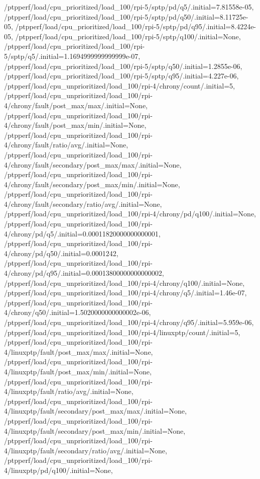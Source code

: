 {    /ptpperf/load/cpu_prioritized/load_100/rpi-5/sptp/pd/q5/.initial=7.81558e-05,
    /ptpperf/load/cpu_prioritized/load_100/rpi-5/sptp/pd/q50/.initial=8.11725e-05,
    /ptpperf/load/cpu_prioritized/load_100/rpi-5/sptp/pd/q95/.initial=8.4224e-05,
    /ptpperf/load/cpu_prioritized/load_100/rpi-5/sptp/q100/.initial=None,
    /ptpperf/load/cpu_prioritized/load_100/rpi-5/sptp/q5/.initial=1.1694999999999999e-07,
    /ptpperf/load/cpu_prioritized/load_100/rpi-5/sptp/q50/.initial=1.2855e-06,
    /ptpperf/load/cpu_prioritized/load_100/rpi-5/sptp/q95/.initial=4.227e-06,
    /ptpperf/load/cpu_unprioritized/load_100/rpi-4/chrony/count/.initial=5,
    /ptpperf/load/cpu_unprioritized/load_100/rpi-4/chrony/fault/post_max/max/.initial=None,
    /ptpperf/load/cpu_unprioritized/load_100/rpi-4/chrony/fault/post_max/min/.initial=None,
    /ptpperf/load/cpu_unprioritized/load_100/rpi-4/chrony/fault/ratio/avg/.initial=None,
    /ptpperf/load/cpu_unprioritized/load_100/rpi-4/chrony/fault/secondary/post_max/max/.initial=None,
    /ptpperf/load/cpu_unprioritized/load_100/rpi-4/chrony/fault/secondary/post_max/min/.initial=None,
    /ptpperf/load/cpu_unprioritized/load_100/rpi-4/chrony/fault/secondary/ratio/avg/.initial=None,
    /ptpperf/load/cpu_unprioritized/load_100/rpi-4/chrony/pd/q100/.initial=None,
    /ptpperf/load/cpu_unprioritized/load_100/rpi-4/chrony/pd/q5/.initial=0.00011820000000000001,
    /ptpperf/load/cpu_unprioritized/load_100/rpi-4/chrony/pd/q50/.initial=0.0001242,
    /ptpperf/load/cpu_unprioritized/load_100/rpi-4/chrony/pd/q95/.initial=0.00013800000000000002,
    /ptpperf/load/cpu_unprioritized/load_100/rpi-4/chrony/q100/.initial=None,
    /ptpperf/load/cpu_unprioritized/load_100/rpi-4/chrony/q5/.initial=1.46e-07,
    /ptpperf/load/cpu_unprioritized/load_100/rpi-4/chrony/q50/.initial=1.5020000000000002e-06,
    /ptpperf/load/cpu_unprioritized/load_100/rpi-4/chrony/q95/.initial=5.959e-06,
    /ptpperf/load/cpu_unprioritized/load_100/rpi-4/linuxptp/count/.initial=5,
    /ptpperf/load/cpu_unprioritized/load_100/rpi-4/linuxptp/fault/post_max/max/.initial=None,
    /ptpperf/load/cpu_unprioritized/load_100/rpi-4/linuxptp/fault/post_max/min/.initial=None,
    /ptpperf/load/cpu_unprioritized/load_100/rpi-4/linuxptp/fault/ratio/avg/.initial=None,
    /ptpperf/load/cpu_unprioritized/load_100/rpi-4/linuxptp/fault/secondary/post_max/max/.initial=None,
    /ptpperf/load/cpu_unprioritized/load_100/rpi-4/linuxptp/fault/secondary/post_max/min/.initial=None,
    /ptpperf/load/cpu_unprioritized/load_100/rpi-4/linuxptp/fault/secondary/ratio/avg/.initial=None,
    /ptpperf/load/cpu_unprioritized/load_100/rpi-4/linuxptp/pd/q100/.initial=None,
}
